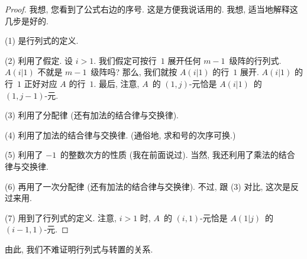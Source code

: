 \documentclass[../libro.tex]{subfiles}
\begin{document}
\begin{proof}
    我想, 您看到了公式右边的序号.
    这是方便我说话用的.
    我想, 适当地解释这几步是好的.

    (1) 是行列式的定义.

    (2) 利用了假定.
    设 \(i > 1\).
    我们假定可按行~\(1\) 展开任何 \(m - 1\)~级阵的行列式.
    \(A(i|1)\) 不就是 \(m - 1\)~级阵吗?
    那么, 我们就按 \(A(i|1)\) 的行~\(1\) 展开.
    \(A(i|1)\) 的行~\(1\) 正好对应
    \(A\) 的行~\(1\).
    最后, 注意,
    \(A\)~的 \((1, j)\)-元恰是
    \(A(i|1)\)~的 \((1, j - 1)\)-元.

    (3) 利用了分配律 (还有加法的结合律与交换律).

    (4) 利用了加法的结合律与交换律.
    (通俗地, 求和号的次序可换.)

    (5) 利用了 \(-1\)~的整数次方的性质 (我在前面说过).
    当然, 我还利用了乘法的结合律与交换律.

    (6) 再用了一次分配律 (还有加法的结合律与交换律).
    不过, 跟 (3) 对比, 这次是反过来用.

    (7) 用到了行列式的定义.
    注意, \(i > 1\) 时,
    \(A\)~的 \((i, 1)\)-元恰是
    \(A(1|j)\)~的 \((i - 1, 1)\)-元.
\end{proof}

由此, 我们不难证明行列式与转置的关系.



\end{document}
